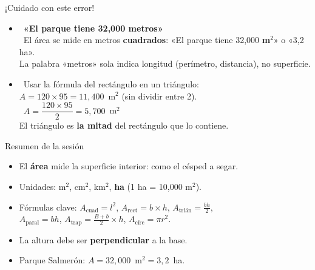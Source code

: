 \documentclass[aspectratio=169, 10pt, spanish]{beamer}
\begin{document}
\begin{frame}{¡Cuidado con este error!}
  \begin{errorbox}
    \begin{itemize}
      \item \incorrecto\
            \textbf{«El parque tiene 32{,}000 metros»}
            \\[6pt]
            \correcto\
            El área se mide en metros \textbf{cuadrados}:
            «El parque tiene 32{,}000 \textbf{m$^2$}» o «3{,}2 ha».
            \\
            La palabra «metros» sola indica longitud (perímetro, distancia),
            no superficie.

      \vspace{0.4cm}
      \item \incorrecto\
            Usar la fórmula del rectángulo en un triángulo:
            \\
            $A = 120 \times 95 = 11{,}400$~m$^2$ (sin dividir entre 2).
            \\[6pt]
            \correcto\
            $A = \dfrac{120 \times 95}{2} = 5{,}700$~m$^2$
            \\
            El triángulo es \textbf{la mitad} del rectángulo que lo contiene.
    \end{itemize}
  \end{errorbox}
\end{frame}

\begin{frame}{Resumen de la sesión}
  \begin{resumenbox}
    \begin{itemize}
      \item El \textbf{área} mide la superficie interior:
            como el césped a segar.
      \item Unidades: m$^2$, cm$^2$, km$^2$, \textbf{ha}
            (1 ha = 10{,}000 m$^2$).
      \item Fórmulas clave:
        $A_{\text{cuad}} = l^2$, \quad
        $A_{\text{rect}} = b \times h$, \quad
        $A_{\text{trián}} = \tfrac{bh}{2}$, \\
        $A_{\text{paral}} = bh$, \quad
        $A_{\text{trap}} = \tfrac{B+b}{2} \times h$, \quad
        $A_{\text{círc}} = \pi r^2$.
      \item La altura debe ser \textbf{perpendicular} a la base.
      \item Parque Salmerón: $A = 32{,}000$~m$^2 = 3{,}2$~ha.
    \end{itemize}
  \end{resumenbox}
\end{frame}
\end{document}
